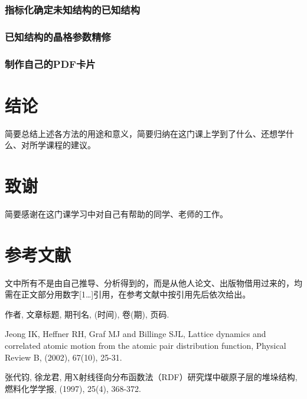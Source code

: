 \documentclass[12pt,a4paper]{ctexart}
\newcommand{\smtext}[1]{{\fontsize{9.3pt}{12pt}\selectfont #1}}
\begin{document}
\subsubsection{指标化确定未知结构的已知结构}

\subsubsection{已知结构的晶格参数精修}

\subsubsection{制作自己的PDF卡片}

\section{结\hspace{0.5em}论}

\smtext{简要总结上述各方法的用途和意义，简要归纳在这门课上学到了什么、还想学什么、对所学课程的建议。}

\section*{致\hspace{0.5em}谢}

\smtext{简要感谢在这门课学习中对自己有帮助的同学、老师的工作。}

\section*{参考文献}

\smtext{文中所有不是由自己推导、分析得到的，而是从他人论文、出版物借用过来的，均需在正文部分用数字[1…]引用，在参考文献中按引用先后依次给出。}

\smtext{作者, 文章标题, 期刊名, (时间), 卷(期), 页码.}

\smtext{[1] Jeong IK, Heffner RH, Graf MJ and Billinge SJL, Lattice dynamics and correlated atomic motion from the atomic pair distribution function, Physical Review B, (2002), 67(10), 25-31.}

{\songti\fontsize{9.3pt}{12pt}\selectfont [2] 张代钧, 徐龙君, 用X射线径向分布函数法（RDF）研究煤中碳原子层的堆垛结构, 燃料化学学报, (1997), 25(4), 368-372.\par}
\end{document}
